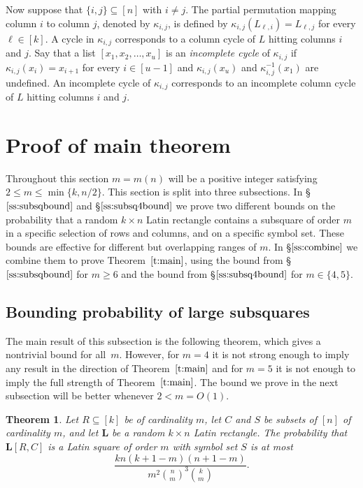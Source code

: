 \documentclass[12pt]{article}
\newtheorem{thm}{Theorem}[section]
\theoremstyle{definition}
\numberwithin{equation}{section}
\def\sref#1{\S$\ref{#1}$}
\def\tref#1{Theorem~$\ref{#1}$}
\renewcommand{\leq}{\leqslant}
\renewcommand{\ge}{\geqslant}
\renewcommand{\L}{\mathbf{L}}
\begin{document}
	Now suppose that $\{i, j\} \subseteq [n]$ with $i \neq j$. The partial
	permutation mapping column $i$ to column $j$, denoted by $\kappa_{i,j}$,
	is defined by $\kappa_{i, j}(L_{\ell, i}) = L_{\ell, j}$ for
	every $\ell \in [k]$. A cycle in $\kappa_{i, j}$ corresponds to a
	column cycle of $L$ hitting columns $i$ and $j$. Say that a list
	$[x_1, x_2, \ldots, x_u]$ is an \emph{incomplete cycle} of $\kappa_{i,j}$
	if $\kappa_{i, j}(x_i) = x_{i+1}$ for every $i \in [u-1]$ and
	$\kappa_{i, j}(x_u)$ and $\kappa_{i, j}^{-1}(x_1)$ are undefined. An
	incomplete cycle of $\kappa_{i, j}$ corresponds to an incomplete
	column cycle of $L$ hitting columns $i$ and $j$.
	
	\section{Proof of main theorem}\label{s:main}
	
	Throughout this section $m = m(n)$ will be a positive integer
	satisfying $2 \leq m \leq \min\{k, n/2\}$.
	This section is split into three subsections. In \sref{ss:subsqbound}
	and \sref{ss:subsq4bound} we prove two different bounds on the
	probability that a random $k \times n$ Latin rectangle contains a
	subsquare of order $m$ in a specific selection of rows and columns,
	and on a specific symbol set. These bounds are effective for different
	but overlapping ranges of $m$. In \sref{ss:combine} we combine them to prove \tref{t:main}, using the bound from \sref{ss:subsqbound} for $m\ge6$ and the
	bound from \sref{ss:subsq4bound} for $m\in\{4,5\}$.
	
	\subsection{Bounding probability of large subsquares}\label{ss:subsqbound}
	
	The main result of this subsection is the following theorem, which
	gives a nontrivial bound for all~$m$. However, for $m=4$ it is not
	strong enough to imply any result in the direction of
	\tref{t:main} and for $m=5$ it is not enough to imply the full strength of
	\tref{t:main}.  The bound we prove in the next subsection will be
	better whenever $2<m=O(1)$.
	
	\begin{thm}\label{t:subsqbound}
		Let $R \subseteq [k]$ be of cardinality $m$, let $C$ and $S$
		be subsets of $[n]$ of cardinality $m$, and let $\L$ be a
		random $k \times n$ Latin rectangle. The probability that
		$\L[R,C]$ is a Latin square of order $m$ with symbol set $S$
		is at most
		\begin{equation*}\label{e:ub2}
			\frac{kn(k+1-m)(n+1-m)}{m^2\binom{n}{m}^3\binom{k}{m}}.
		\end{equation*}
	\end{thm}
	
\end{document}
